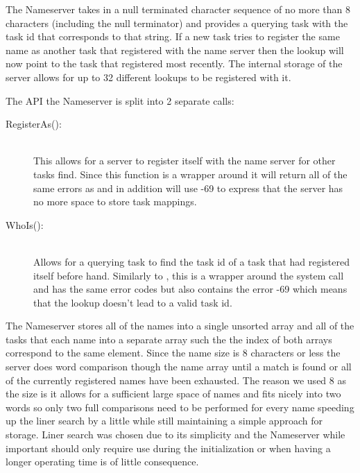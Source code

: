 \documentclass[pdftex,10pt,a4paper]{article}
\begin{document}
The Nameserver takes in a null terminated character sequence of no
more than 8 characters (including the null terminator) and provides a
querying task with the task id that corresponds to that string. If a
new task tries to register the same name as another task that
registered with the name server then the lookup will now point to the
task that registered most recently. The internal storage of the server
allows for up to 32 different lookups to be registered with it.

The API the Nameserver is split into 2 separate calls:
\begin{description}
\item[RegisterAs():] \hfill \\
This allows for a server to register itself with the name server for
other tasks find. Since this function is a wrapper around 
it will return all of the same errors as  and in addition
will use -69 to express that the server has no more space to store
task mappings.

\item[WhoIs():] \hfill \\
Allows for a querying task to find the task id of a task that had
registered itself before hand. Similarly to , this
is a wrapper around the  system call and has the same
error codes but also contains the error -69 which means that the
lookup doesn’t lead to a valid task id.
\end{description}

The Nameserver stores all of the names into a single unsorted array
and all of the tasks that each name into a separate array such the the
index of both arrays correspond to the same element. Since the name
size is 8 characters or less the server does word comparison though
the name array until a match is found or all of the currently
registered names have been exhausted. The reason we used 8 as the size
is it allows for a sufficient large space of names and fits nicely
into two words so only two full comparisons need to be performed for
every name speeding up the liner search by a little while still
maintaining a simple approach for storage. Liner search was chosen due
to its simplicity and the Nameserver while important should only
require use during the initialization or when having a longer
operating time is of little consequence.
\end{document}
